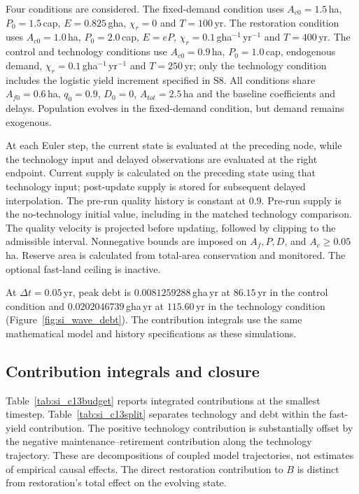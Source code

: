 \documentclass[11pt,a4paper]{article}
\begin{document}
Four conditions are considered. The fixed-demand condition uses $A_{c0}=1.5$\,ha, $P_0=1.5$\,cap, $E=0.825$\,gha, $\chi_r=0$ and $T=100$\,yr. The restoration condition uses $A_{c0}=1.0$\,ha, $P_0=2.0$\,cap, $E=eP$, $\chi_r=0.1$\,gha$^{-1}$\,yr$^{-1}$ and $T=400$\,yr. The control and technology conditions use $A_{c0}=0.9$\,ha, $P_0=1.0$\,cap, endogenous demand, $\chi_r=0.1$\,gha$^{-1}$\,yr$^{-1}$ and $T=250$\,yr; only the technology condition includes the logistic yield increment specified in S8. All conditions share $A_{f0}=0.6$\,ha, $q_0=0.9$, $D_0=0$, $A_{tot}=2.5$\,ha and the baseline coefficients and delays. Population evolves in the fixed-demand condition, but demand remains exogenous.

At each Euler step, the current state is evaluated at the preceding node, while the technology input and delayed observations are evaluated at the right endpoint. Current supply is calculated on the preceding state using that technology input; post-update supply is stored for subsequent delayed interpolation. The pre-run quality history is constant at $0.9$. Pre-run supply is the no-technology initial value, including in the matched technology comparison. The quality velocity is projected before updating, followed by clipping to the admissible interval. Nonnegative bounds are imposed on $A_f,P,D$, and $A_c\ge0.05$\,ha. Reserve area is calculated from total-area conservation and monitored. The optional fast-land ceiling is inactive.

At $\Delta t=0.05$\,yr, peak debt is $0.0081259288$\,gha\,yr at $86.15$\,yr in the control condition and $0.0202046739$\,gha\,yr at $115.60$\,yr in the technology condition (Figure~\ref{fig:si_wave_debt}). The contribution integrals use the same mathematical model and history specifications as these simulations.

\subsection{Contribution integrals and closure}

Table~\ref{tab:si_c13budget} reports integrated contributions at the smallest timestep. Table~\ref{tab:si_c13split} separates technology and debt within the fast-yield contribution. The positive technology contribution is substantially offset by the negative maintenance--retirement contribution along the technology trajectory. These are decompositions of coupled model trajectories, not estimates of empirical causal effects. The direct restoration contribution to $B$ is distinct from restoration's total effect on the evolving state.
\end{document}
